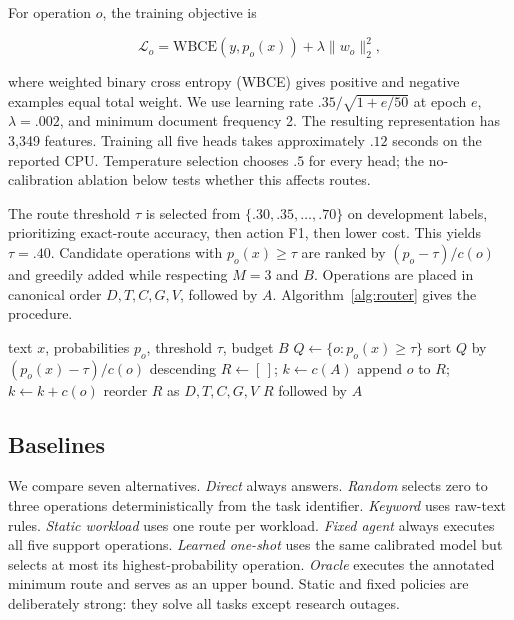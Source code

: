 \documentclass[letterpaper]{article} %
\begin{document}
For operation $o$, the training objective is

\begin{equation}
\mathcal{L}_o=\mathrm{WBCE}(y,p_o(x))+\lambda\|w_o\|_2^2,
\end{equation}

where weighted binary cross entropy (WBCE) gives positive and negative examples equal total weight. We use learning rate $.35/\sqrt{1+e/50}$ at epoch $e$, $\lambda=.002$, and minimum document frequency 2. The resulting representation has 3,349 features. Training all five heads takes approximately $.12$ seconds on the reported CPU. Temperature selection chooses $.5$ for every head; the no-calibration ablation below tests whether this affects routes.

The route threshold $\tau$ is selected from $\{.30,.35,\ldots,.70\}$ on development labels, prioritizing exact-route accuracy, then action F1, then lower cost. This yields $\tau=.40$. Candidate operations with $p_o(x)\geq\tau$ are ranked by $(p_o-\tau)/c(o)$ and greedily added while respecting $M=3$ and $B$. Operations are placed in canonical order $D,T,C,G,V$, followed by $A$. Algorithm~\ref{alg:router} gives the procedure.

\begin{algorithm}[t]
\caption{Budget-Aware Text Meta-Routing}
\label{alg:router}
\begin{algorithmic}[1]
\REQUIRE text $x$, probabilities $p_o$, threshold $\tau$, budget $B$
\STATE $Q\leftarrow\{o:p_o(x)\geq\tau\}$
\STATE sort $Q$ by $(p_o(x)-\tau)/c(o)$ descending
\STATE $R\leftarrow[\,]$; $k\leftarrow c(A)$
        \STATE append $o$ to $R$; $k\leftarrow k+c(o)$
    \ENDIF
\ENDFOR
\STATE reorder $R$ as $D,T,C,G,V$
\RETURN $R$ followed by $A$
\end{algorithmic}
\end{algorithm}

\subsection{Baselines}

We compare seven alternatives. \emph{Direct} always answers. \emph{Random} selects zero to three operations deterministically from the task identifier. \emph{Keyword} uses raw-text rules. \emph{Static workload} uses one route per workload. \emph{Fixed agent} always executes all five support operations. \emph{Learned one-shot} uses the same calibrated model but selects at most its highest-probability operation. \emph{Oracle} executes the annotated minimum route and serves as an upper bound. Static and fixed policies are deliberately strong: they solve all tasks except research outages.
\end{document}
